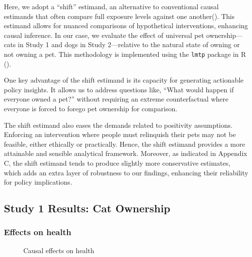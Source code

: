 \documentclass[
  singlecolumn,
  9pt]{article}
\begin{document}
Here, we adopt a ``shift'' estimand, an alternative to conventional
causal estimands that often compare full exposure levels against one
another(). This
estimand allows for nuanced comparisons of hypothetical interventions,
enhancing causal inference. In our case, we evaluate the effect of
universal pet ownership---cats in Study 1 and dogs in Study 2---relative
to the natural state of owning or not owning a pet. This methodology is
implemented using the \texttt{lmtp} package in R
().

One key advantage of the shift estimand is its capacity for generating
actionable policy insights. It allows us to address questions like,
``What would happen if everyone owned a pet?'' without requiring an
extreme counterfactual where everyone is forced to forego pet ownership
for comparison.

The shift estimand also eases the demands related to positivity
assumptions. Enforcing an intervention where people must relinquish
their pets may not be feasible, either ethically or practically. Hence,
the shift estimand provides a more attainable and sensible analytical
framework. Moreover, as indicated in Appendix C, the shift estimand
tends to produce slightly more conservative estimates, which adds an
extra layer of robustness to our findings, enhancing their reliability
for policy implications.

\newpage{}

\subsection{Study 1 Results: Cat
Ownership}\label{study-1-results-cat-ownership}

\subsubsection{Effects on health}\label{effects-on-health}

\begin{figure}


\caption{\label{fig-results-health-cats}Causal effects on health}

\end{figure}%
\end{document}
